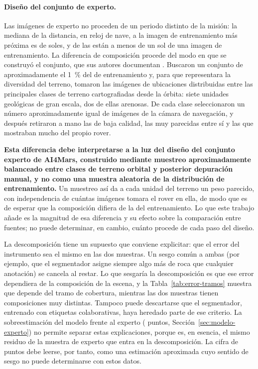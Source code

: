 \paragraph{Diseño del conjunto de experto.} Las imágenes de experto no proceden de un periodo
distinto de la misión: la mediana de la distancia, en reloj de nave, a la imagen de
entrenamiento más próxima es de \cFugaExpSoles{} soles, y \cFugaExpSol{} de las \cNGold{} están
a menos de un sol de una imagen de entrenamiento. La diferencia de composición procede del modo
en que se construyó el conjunto, que sus autores documentan \citep{swan2021ai4mars}. Buscaron
un conjunto de aproximadamente el \SI{1}{\percent} del de entrenamiento y, para que representara
la diversidad del terreno, tomaron las imágenes de ubicaciones distribuidas entre las
principales clases de terreno cartografiadas desde la órbita: siete unidades geológicas de gran
escala, dos de ellas arenosas. De cada clase seleccionaron un número aproximadamente igual de
imágenes de la cámara de navegación, y después retiraron a mano las de baja calidad, las muy
parecidas entre sí y las que mostraban mucho del propio rover.

\textbf{Esta diferencia debe interpretarse a la luz del diseño del conjunto experto de AI4Mars,
construido mediante muestreo aproximadamente balanceado entre clases de terreno orbital y
posterior depuración manual, y no como una muestra aleatoria de la distribución de
entrenamiento.} Un muestreo así da a cada unidad del terreno un peso parecido, con independencia
de cuántas imágenes tomara el rover en ella, de modo que es de esperar que la composición
difiera de la del entrenamiento. Lo que este trabajo añade es la magnitud de esa diferencia y su
efecto sobre la comparación entre fuentes; no puede determinar, en cambio, cuánto procede de
cada paso del diseño.

La descomposición tiene un supuesto que conviene explicitar: que el error del instrumento sea
el mismo en las dos muestras. Un sesgo común a ambas (por ejemplo, que el segmentador asigne
siempre algo más de roca que cualquier anotación) se cancela al restar. Lo que sesgaría la
descomposición es que ese error dependiera de la composición de la escena, y la
Tabla~\ref{tab:error-tramos} muestra que depende del tramo de cobertura, mientras las dos
muestras tienen composiciones muy distintas. Tampoco puede descartarse que el segmentador,
entrenado con etiquetas colaborativas, haya heredado parte de ese criterio. La sobreestimación
del modelo frente al experto (\cBAExpMedia{} puntos, Sección~\ref{sec:modelo-experto}) no
permite separar estas explicaciones, porque es, en esencia, el mismo residuo de la muestra de
experto que entra en la descomposición. La cifra de \cDescAnot{} puntos debe leerse, por tanto,
como una estimación aproximada cuyo sentido de sesgo no puede determinarse con estos datos.


